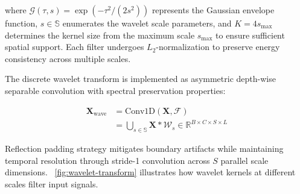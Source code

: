 \documentclass[conference]{IEEEtran}
\begin{document}
where $\mathcal{G}(\tau,s) = \exp(-\tau^2/(2s^2))$ represents the Gaussian envelope function, $s \in \mathbb{S}$ enumerates the wavelet scale parameters, and $K=4s_{\text{max}}$ determines the kernel size from the maximum scale $s_{\text{max}}$ to ensure sufficient spatial support. Each filter undergoes $L_2$-normalization to preserve energy consistency across multiple scales.

The discrete wavelet transform is implemented as asymmetric depth-wise separable convolution with spectral preservation properties:

\begin{equation}
    \begin{aligned}
        \mathbf{X}_{\text{wave}} & = \text{Conv1D}(\mathbf{X}, \mathcal{F})                                                                 \\
                                 & = \bigcup_{s \in \mathbb{S}} \mathbf{X} \ast \mathcal{W}_s \in \mathbb{R}^{B \times C \times S \times L}
    \end{aligned}
\end{equation}

Reflection padding strategy mitigates boundary artifacts while maintaining temporal resolution through stride-1 convolution across $S$ parallel scale dimensions. \figurename~\ref{fig:wavelet-transform} illustrates how wavelet kernels at different scales filter input signals.
\end{document}
